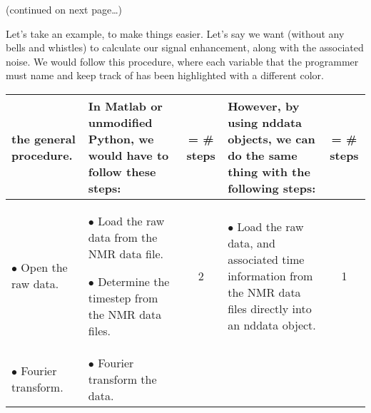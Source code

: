 (continued on next page\ldots)

\vspace*{\fill}\pagebreak
Let's take an example, to make things easier.
Let's say we want (without any bells and whistles) to calculate our signal enhancement,
    along with the associated noise.
We would follow this procedure, where each variable
    that the programmer must name and keep track of has been highlighted
    with a different color.

    \quad

\begin{minipage}{\textwidth}
    \begin{tabular}{p{}|p{}c|p{}c}
            {\bf the general procedure.}
            &
            {\bf In Matlab or unmodified Python, we would have to follow these steps:}
            &
            = \# steps
            &
            {\bf However, by using nddata objects, we can do the same thing with the following steps:}
            &
            = \# steps
            \\ \hline\hline
            $\bullet$ Open the raw data.
            &
            \begin{minipage}{0.3\textwidth}
                $\bullet$ Load the raw {\color{red} data} from the NMR data file.

                $\bullet$ Determine the {\color{blue} timestep} from the NMR data files.
            \end{minipage}
            &
            2
            &
            \begin{minipage}{0.3\textwidth}
            $\bullet$ Load the raw data, and associated time information from the NMR data files directly into an {\color{red} nddata object}.
            \end{minipage}
            &
            1
            \\ \hline
            $\bullet$ Fourier transform.
            &
            \begin{minipage}{0.3\textwidth}
                $\bullet$ Fourier transform the {\color{red} data}.
            

\end{minipage}
\end{tabular}
\end{minipage}
